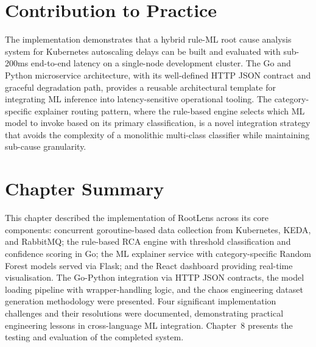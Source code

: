 \section{Contribution to Practice}
The implementation demonstrates that a hybrid rule-ML root cause analysis system for Kubernetes autoscaling delays can be built and evaluated with sub-200ms end-to-end latency on a single-node development cluster. The Go and Python microservice architecture, with its well-defined HTTP JSON contract and graceful degradation path, provides a reusable architectural template for integrating ML inference into latency-sensitive operational tooling. The category-specific explainer routing pattern, where the rule-based engine selects which ML model to invoke based on its primary classification, is a novel integration strategy that avoids the complexity of a monolithic multi-class classifier while maintaining sub-cause granularity.

\section{Chapter Summary}
This chapter described the implementation of RootLens across its core components: concurrent goroutine-based data collection from Kubernetes, KEDA, and RabbitMQ; the rule-based RCA engine with threshold classification and confidence scoring in Go; the ML explainer service with category-specific Random Forest models served via Flask; and the React dashboard providing real-time visualisation. The Go-Python integration via HTTP JSON contracts, the model loading pipeline with wrapper-handling logic, and the chaos engineering dataset generation methodology were presented. Four significant implementation challenges and their resolutions were documented, demonstrating practical engineering lessons in cross-language ML integration. Chapter~8 presents the testing and evaluation of the completed system.
